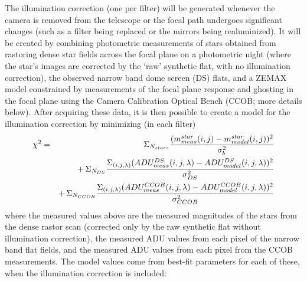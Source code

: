 \documentclass[12pt,preprint]{aastex}
\begin{document}
The illumination correction (one per filter) will be generated
whenever the camera is removed from the telescope or the focal path
undergoes significant changes (such as a filter being replaced or the
mirrors being realuminized). It will be created by combining
photometric measurements of stars obtained from rastoring dense star
fields across the focal plane on a photometric night (where the star's
images are corrected by the `raw' synthetic flat, with no illumination
correction), the observed narrow band dome screen (DS) flats, and a
ZEMAX model constrained by measurements of the focal plane response
and ghosting in the focal plane using the Camera Calibration Optical
Bench (CCOB; more details below). After acquiring these data, it is then possible to
create a model for the illumination correction by minimizing (in each
filter)
\begin{eqnarray}
 \chi^2 & = & \Sigma_{N_{stars}} { (m^{star}_{meas}(i,j) - m^{star}_{model}(i,j))^2
\over \sigma_b^2}  \\
  & & +\, \Sigma_{N_{DS}} { \Sigma_{(i,j,\lambda)}
    (ADU^{DS}_{meas}(i,j,\lambda) - ADU^{DS}_{ model}(i,j,\lambda))^2 \over
    \sigma_{DS}^2 }  \nonumber  \\
 & & +\,  \Sigma_{N_{CCOB}} { \Sigma_{(i,j,\lambda)}
   (ADU^{CCOB}_{meas}(i,j,\lambda) - ADU^{CCOB}_{model}(i,j,\lambda))^2 \over
   \sigma_{CCOB}^2 }   \nonumber
\end{eqnarray}
where the measured values above are the measured magnitudes of the stars
from the dense rastor scan (corrected only by the raw synthetic flat
without illumination correction), the measured ADU values from each pixel of the narrow band
flat fields, and the measured ADU values from each pixel from the CCOB
measurements. The model values come from best-fit parameters for each
of these, when the illumination correction is included: 
\end{document}

